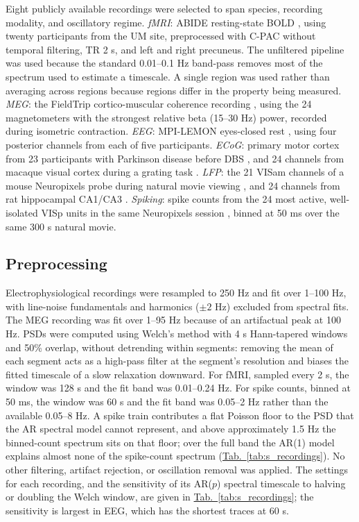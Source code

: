 \documentclass[pdflatex,lineno,sn-nature]{sn-jnl}
\newcommand{\tabpanel}[2][]{\hyperref[#2]{Tab.~#1\ref*{#2}}}
\theoremstyle{thmstyleone}
\theoremstyle{thmstyletwo}
\theoremstyle{thmstylethree}
\begin{document}
Eight publicly available recordings were selected to span species, recording modality, and oscillatory regime. \textit{fMRI}: ABIDE resting-state BOLD \cite{di_martino_autism_2014}, using twenty participants from the UM site, preprocessed with C-PAC without temporal filtering, TR 2 s, and left and right precuneus. The unfiltered pipeline was used because the standard 0.01--0.1 Hz band-pass removes most of the spectrum used to estimate a timescale. A single region was used rather than averaging across regions because regions differ in the property being measured. \textit{MEG}: the FieldTrip cortico-muscular coherence recording \cite{schoffelen_neuronal_2005, oostenveld_fieldtrip_2011}, using the 24 magnetometers with the strongest relative beta (15--30 Hz) power, recorded during isometric contraction. \textit{EEG}: MPI-LEMON eyes-closed rest \cite{babayan_mind_2019}, using four posterior channels from each of five participants. \textit{ECoG}: primary motor cortex from 23 participants with Parkinson disease before DBS \cite{cole_nonsinusoidal_2017}, and 24 channels from macaque visual cortex during a grating task \cite{nagasaka_multidimensional_2011}. \textit{LFP}: the 21 VISam channels of a mouse Neuropixels probe during natural movie viewing \cite{siegle_survey_2021}, and 24 channels from rat hippocampal CA1/CA3 \cite{mizuseki_theta_2009, mizuseki_hc3_2013}. \textit{Spiking}: spike counts from the 24 most active, well-isolated VISp units in the same Neuropixels session \cite{siegle_survey_2021}, binned at 50 ms over the same 300 s natural movie.

\subsection{Preprocessing}

Electrophysiological recordings were resampled to 250 Hz and fit over 1--100 Hz, with line-noise fundamentals and harmonics ($\pm 2$ Hz) excluded from spectral fits. The MEG recording was fit over 1--95 Hz because of an artifactual peak at 100 Hz. PSDs were computed using Welch's method with 4 s Hann-tapered windows and 50\% overlap, without detrending within segments: removing the mean of each segment acts as a high-pass filter at the segment's resolution and biases the fitted timescale of a slow relaxation downward. For fMRI, sampled every 2 s, the window was 128 s and the fit band was 0.01--0.24 Hz. For spike counts, binned at 50 ms, the window was 60 s and the fit band was 0.05--2 Hz rather than the available 0.05--8 Hz. A spike train contributes a flat Poisson floor to the PSD that the AR spectral model cannot represent, and above approximately 1.5 Hz the binned-count spectrum sits on that floor; over the full band the AR(1) model explains almost none of the spike-count spectrum (\tabpanel{tab:s_recordings}). No other filtering, artifact rejection, or oscillation removal was applied. The settings for each recording, and the sensitivity of its AR($p$) spectral timescale to halving or doubling the Welch window, are given in \tabpanel{tab:s_recordings}; the sensitivity is largest in EEG, which has the shortest traces at 60 s.
\end{document}
